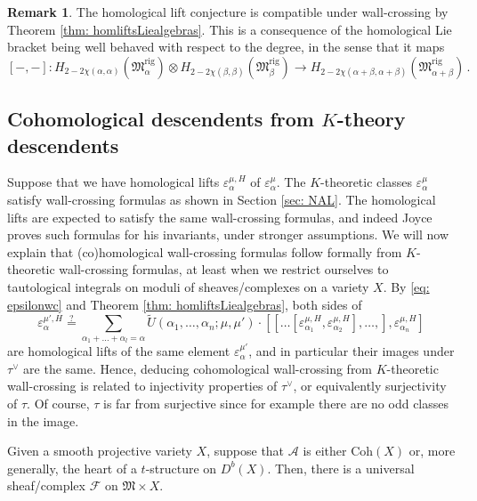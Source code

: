 \documentclass[12pt]{amsart}
\theoremstyle{definition}
\newtheorem{remark}[definition]{Remark}
\newcommand{\CA}{{\mathcal A}}
\newcommand{\CF}{{\mathcal F}}
\newcommand{\1}{\mathbf 1}
\newcommand{\FM}{{\mathfrak{M}}}
\newcommand{\Coh}{\mathrm{Coh}}
\newcommand{\rig}{\mathrm{rig}}
\begin{document}
\begin{remark}\label{rmk: homliftswallcrossing}
The homological lift conjecture is compatible under wall-crossing by Theorem \ref{thm: homliftsLiealgebras}. This is a consequence of the homological Lie bracket being well behaved with respect to the degree, in the sense that it maps
\[[-,-]\colon H_{2-2\chi(\alpha, \alpha)}(\FM^\rig_\alpha)\otimes H_{2-2\chi(\beta, \beta)}(\FM^\rig_\beta)\to H_{2-2\chi(\alpha+\beta, \alpha+\beta)}(\FM^\rig_{\alpha+\beta})\,.\]
\end{remark}



\subsection{Cohomological descendents from $K$-theory descendents}
\label{subsec: homliftdescendents}

Suppose that we have homological lifts $\varepsilon_\alpha^{\mu, H}$ of $\varepsilon_\alpha^\mu$. The $K$-theoretic classes $\varepsilon_\alpha^\mu$ satisfy wall-crossing formulas as shown in Section \ref{sec: NAL}. The homological lifts are expected to satisfy the same wall-crossing formulas, and indeed Joyce proves such formulas for his invariants, under stronger assumptions. We will now explain that (co)homological wall-crossing formulas follow formally from $K$-theoretic wall-crossing formulas, at least when we restrict ourselves to tautological integrals on moduli of sheaves/complexes on a variety $X$. By \eqref{eq: epsilonwc} and Theorem \ref{thm: homliftsLiealgebras}, both sides of
\[\varepsilon_{\alpha}^{\mu', H}
   \overset{?}{=}\sum_{\alpha_1+\ldots+\alpha_l=\alpha}\tilde U(\alpha_1, \ldots, \alpha_n; \mu, \mu')\cdot [[\ldots [\varepsilon_{\alpha_1}^{\mu, H}, \varepsilon_{\alpha_2}^{\mu, H}], \ldots, ],\varepsilon_{\alpha_n}^{\mu, H}]\]
are homological lifts of the same element $\varepsilon_\alpha^{\mu'}$, and in particular their images under $\tau^\vee$ are the same. Hence, deducing cohomological wall-crossing from $K$-theoretic wall-crossing is related to injectivity properties of $\tau^\vee$, or equivalently surjectivity of $\tau$. Of course, $\tau$ is far from surjective since for example there are no odd classes in the image.

Given a smooth projective variety $X$, suppose that $\CA$ is either $\Coh(X)$ or, more generally, the heart of a $t$-structure on $D^b(X)$. Then, there is a universal sheaf/complex $\CF$ on $\FM\times X$. 
\end{document}
